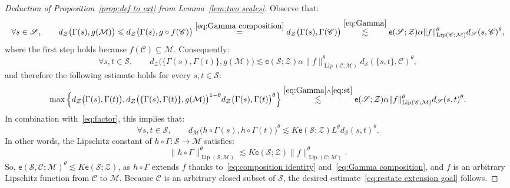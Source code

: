 \documentclass[10pt,a4paper]{amsart}
\DeclareMathOperator{\Lip}{Lip}
\newcommand{\MM}{\mathcal{M}}
\renewcommand{\SS}{\mathscr{S}}
\newcommand{\cZ}{\mathcal{Z}}
\newcommand{\ee}{\mathsf{e}}
\renewcommand{\le}{\leqslant}
\newcommand{\sub}{\mathscr{C}}
\renewcommand{\subset}{\subseteq}
\begin{document}
\begin{proof}[Deduction of Proposition~\ref{prop:def to ext}  from Lemma~\ref{lem:two scales}]
 Observe that:
$$
\forall s\in \SS,\qquad d_\cZ\big(\Gamma(s),g(\MM)\big)\le  d_\cZ\big(\Gamma(s),g\circ f(\sub)\big)\stackrel{\eqref{eq:Gamma composition}}{=} d_\cZ\big(\Gamma(s),\Gamma(\sub)\big)\stackrel{\eqref{eq:Gamma}}{\lesssim} \ee(\SS;\cZ) \alpha \|f\|_{\Lip(\sub;\MM)}^\theta  d_\SS(s,\sub)^\theta, 
$$
where the first step holds because $f(\sub)\subset \MM$. Consequently:
\begin{equation}\label{eq:st}
\forall s,t\in \SS,\qquad d_\cZ\big(\{\Gamma(s),\Gamma(t)\},g(\MM)\big)\lesssim  \ee(\SS;\cZ) \alpha \|f\|_{\Lip(\sub;\MM)}^\theta   d_\SS(\{s,t\},\sub)^\theta,
\end{equation}
and therefore the following estimate holds for every $s,t\in \SS$:
$$
\max\Big\{d_\cZ\big(\Gamma(s),\Gamma(t)\big),d_\cZ\big(\{\Gamma(s),\Gamma(t)\},g(\MM)\big)^{1-\theta}d_\cZ\big(\Gamma(s),\Gamma(t)\big)^\theta\Big\}
\stackrel{\eqref{eq:Gamma}\wedge\eqref{eq:st}}{ \lesssim} \ee(\SS;\cZ)\alpha \|f\|_{\Lip(\sub;\MM)}^\theta  d_\SS(s,t)^\theta.
$$
In combination with~\eqref{eq:factor}, this implies that: 
$$
\forall s,t\in \SS,\qquad d_\MM\big(h\circ \Gamma(s),h\circ \Gamma(t)\big)^\theta\lesssim K\ee(\SS;\cZ) L^\theta d_\SS(s,t)^\theta.
$$
In other words, the Lipschitz constant of $h\circ \Gamma:\SS\to \MM$ satisfies: 
$$
\|h\circ  \Gamma\|_{\Lip(\SS;\MM)}^\theta\lesssim K\ee(\SS;\cZ)\|f\|_{\Lip(\sub;\MM)}^\theta.
$$
So, $\ee(\SS,\sub;\MM)^\theta\lesssim K\ee(\SS;\cZ)$, as   $h\circ \Gamma$ extends $f$ thanks to~\eqref{eq:composition identity} and~\eqref{eq:Gamma composition},  and $f$ is an arbitrary Lipschitz function from $\sub$ to $\MM$. Because $\sub$ is an arbitrary closed subset of $\SS$, the desired estimate~\eqref{eq:restate extension goal} follows.
\end{proof}
\end{document}
